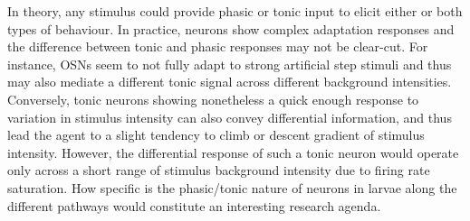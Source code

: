 \documentclass[11pt,a4paper]{article}
\begin{document}
In theory, any stimulus could provide phasic or tonic input to elicit either or both types of behaviour. In practice, neurons show complex adaptation responses and the difference between tonic and phasic responses may not be clear-cut. For instance, OSNs seem to not fully adapt to strong artificial step stimuli \citep{nagel2011biophysical, schulze2015dynamical} and thus may also mediate a different tonic signal across different background intensities. Conversely, tonic neurons showing nonetheless a quick enough response to variation in stimulus intensity can also convey differential information, and thus lead the agent to a slight tendency to climb or descent gradient of stimulus intensity. However, the differential response of such a tonic neuron would operate only across a short range of stimulus background intensity due to firing rate saturation. How specific is the phasic/tonic nature of neurons in larvae along the different pathways would constitute an interesting research agenda.
\end{document}
